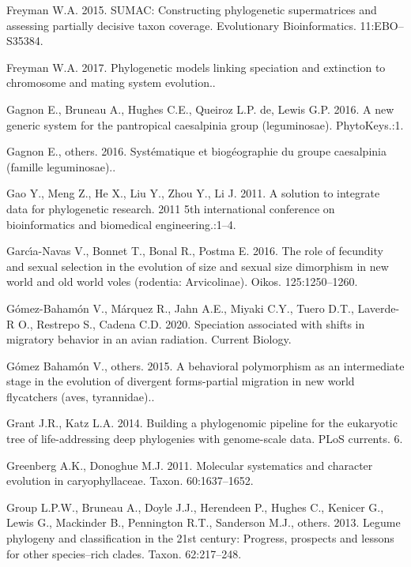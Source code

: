 \documentclass[]{article}
\begin{document}
\leavevmode\hypertarget{ref-freyman2015sumac}{}%
Freyman W.A. 2015. SUMAC: Constructing phylogenetic supermatrices and assessing partially decisive taxon coverage. Evolutionary Bioinformatics. 11:EBO--S35384.

\leavevmode\hypertarget{ref-freyman2017phylogenetic}{}%
Freyman W.A. 2017. Phylogenetic models linking speciation and extinction to chromosome and mating system evolution..

\leavevmode\hypertarget{ref-gagnon2016new}{}%
Gagnon E., Bruneau A., Hughes C.E., Queiroz L.P. de, Lewis G.P. 2016. A new generic system for the pantropical caesalpinia group (leguminosae). PhytoKeys.:1.

\leavevmode\hypertarget{ref-gagnon2016systematique}{}%
Gagnon E., others. 2016. Systématique et biogéographie du groupe caesalpinia (famille leguminosae)..

\leavevmode\hypertarget{ref-gao2011solution}{}%
Gao Y., Meng Z., He X., Liu Y., Zhou Y., Li J. 2011. A solution to integrate data for phylogenetic research. 2011 5th international conference on bioinformatics and biomedical engineering.:1--4.

\leavevmode\hypertarget{ref-garcia2016role}{}%
Garcı́a-Navas V., Bonnet T., Bonal R., Postma E. 2016. The role of fecundity and sexual selection in the evolution of size and sexual size dimorphism in new world and old world voles (rodentia: Arvicolinae). Oikos. 125:1250--1260.

\leavevmode\hypertarget{ref-gomez2020speciation}{}%
Gómez-Bahamón V., Márquez R., Jahn A.E., Miyaki C.Y., Tuero D.T., Laverde-R O., Restrepo S., Cadena C.D. 2020. Speciation associated with shifts in migratory behavior in an avian radiation. Current Biology.

\leavevmode\hypertarget{ref-gomez2015behavioral}{}%
Gómez Bahamón V., others. 2015. A behavioral polymorphism as an intermediate stage in the evolution of divergent forms-partial migration in new world flycatchers (aves, tyrannidae)..

\leavevmode\hypertarget{ref-grant2014building}{}%
Grant J.R., Katz L.A. 2014. Building a phylogenomic pipeline for the eukaryotic tree of life-addressing deep phylogenies with genome-scale data. PLoS currents. 6.

\leavevmode\hypertarget{ref-greenberg2011caryophyllaceae}{}%
Greenberg A.K., Donoghue M.J. 2011. Molecular systematics and character evolution in caryophyllaceae. Taxon. 60:1637--1652.

\leavevmode\hypertarget{ref-legume2013legume}{}%
Group L.P.W., Bruneau A., Doyle J.J., Herendeen P., Hughes C., Kenicer G., Lewis G., Mackinder B., Pennington R.T., Sanderson M.J., others. 2013. Legume phylogeny and classification in the 21st century: Progress, prospects and lessons for other species--rich clades. Taxon. 62:217--248.
\end{document}
